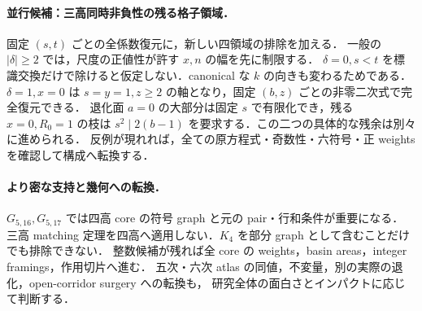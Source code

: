 \paragraph{並行候補：三高同時非負性の残る格子領域．}
固定 $(s,t)$ ごとの全係数復元に，新しい四領域の排除を加える．
一般の $|\delta|\ge2$ では，尺度の正値性が許す $x,n$ の幅を先に制限する．
$\delta=0,s<t$ を標識交換だけで除けると仮定しない．canonical な $k$ の向きも変わるためである．
$\delta=1,x=0$ は $s=y=1,z\ge2$ の軸となり，固定 $(b,z)$ ごとの非零二次式で完全復元できる．
退化面 $a=0$ の大部分は固定 $s$ で有限化でき，残る $x=0,R_0=1$ の枝は
$s^2\mid2(b-1)$ を要求する．この二つの具体的な残余は別々に進められる．
反例が現れれば，全ての原方程式・奇数性・六符号・正 weights を確認して構成へ転換する．

\paragraph{より密な支持と幾何への転換．}
$G_{5,16},G_{5,17}$ では四高 core の符号 graph と元の pair・行和条件が重要になる．
三高 matching 定理を四高へ適用しない．$K_4$ を部分 graph として含むことだけでも排除できない．
整数候補が残れば全 core の weights，basin areas，integer framings，作用切片へ進む．
五次・六次 atlas の同値，不変量，別の実際の退化，open-corridor surgery への転換も，
研究全体の面白さとインパクトに応じて判断する．

